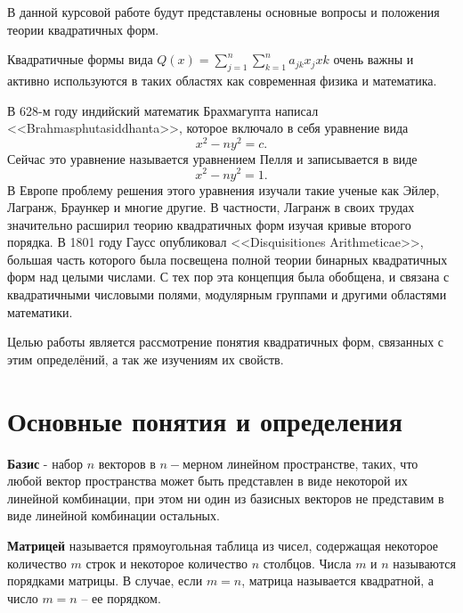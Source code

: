 \documentclass[bachelor, och, coursework, times]{SCWorks}
\author{Sharov Alex}
\newcommand{\udsum}[3]{\sum\limits_{#1}^{#2}{#3}}
\begin{document}

\patitle{} 
\paname{}
\term{} 
\practStart{}  
\practFinish{} 
\MakeTitle

\setcounter{tocdepth}{1}

\tableofcontents

\intro
В данной курсовой работе будут представлены основные вопросы и положения теории квадратичных форм.

Квадратичные формы вида $Q(x)=\udsum{j=1}{n}{}\udsum{k=1}{n}{a_{jk}x_{j}x{k}}$ очень важны и активно используются в таких областях как современная физика и математика.

В 628-м году индийский математик Брахмагупта написал \\ <<Brahmasphutasiddhanta>>, которое включало в себя уравнение вида $$x^2-ny^2=c.$$ Сейчас это уравнение называется уравнением Пелля и записывается в виде $$x^2-ny^2=1.$$ В Европе проблему решения этого уравнения изучали такие ученые как Эйлер, Лагранж, Браункер и многие другие. В частности, Лагранж в своих трудах значительно расширил теорию квадратичных форм изучая кривые второго порядка. В 1801 году Гаусс опубликовал <<Disquisitiones Arithmeticae>>, большая часть которого была посвещена  полной теории бинарных квадратичных форм над целыми числами. С тех пор эта концепция была обобщена, и связана с квадратичными числовыми полями, модулярным группами и другими областями математики.

Целью работы является рассмотрение понятия квадратичных форм, связанных с этим определёний, а так же изучениям их  свойств. 

\section{Основные понятия и определения}

\textbf{Базис} - набор $n$ векторов в $n-$мерном линейном пространстве, таких, что любой вектор пространства может быть представлен в виде некоторой их линейной комбинации, при этом ни один из базисных векторов не представим в виде линейной комбинации остальных. \cite{1}

\textbf{Матрицей} называется прямоугольная таблица из чисел, содержащая некоторое количество $m$ строк и некоторое количество $n$ столбцов. Числа $m$ и $n$ называются порядками матрицы. В случае, если $m = n$, матрица называется квадратной, а число $m= n$ – ее порядком. \cite{2}
\end{document}
